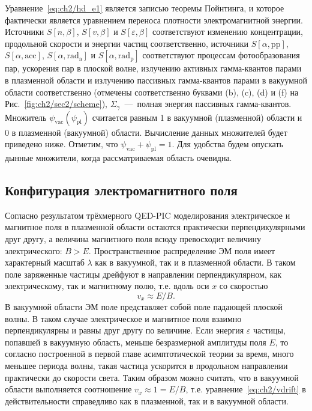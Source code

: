 Уравнение~\eqref{eq:ch2/hd_e1} является записью теоремы Пойнтинга, и которое фактически является уравнением переноса плотности электромагнитной энергии.
Источники $S[n,\beta]$, $S[v,\beta]$ и $S[\varepsilon,\beta]$ соответствуют изменению концентрации, продольной скорости и энергии частиц соответственно, источники $S[\alpha, \mathrm{pp}]$, $S[\alpha, \mathrm{acc}]$, $S[\alpha, \mathrm{rad_a}]$ и $S[\alpha, \mathrm{rad_p}]$ соответствуют процессам фотообразования пар, ускорения пар в плоской волне, излучению активных гамма-квантов парами в плазменной области и излучению пассивных гамма-квантов парами в вакуумной области соответственно (отмечены соответственно буквами (b), (c), (d) и (f) на Рис.~\ref{fig:ch2/sec2/scheme}), $\Sigma_\gamma$~---~полная энергия пассивных гамма-квантов.
Множитель $\psi_\mathrm{vac}(\psi_\mathrm{pl})$ считается равным 1 в вакуумной (плазменной) области и 0 в плазменной (вакуумной) области.
Вычисление данных множителей будет приведено ниже.
Отметим, что $\psi_\mathrm{vac}+\psi_\mathrm{pl}=1$.
Для удобства будем опускать дынные множители, когда рассматриваемая область очевидна.

\subsection{Конфигурация электромагнитного поля}
\label{sub:ch2/sec3/fields}

Согласно результатом трёхмерного QED-PIC моделирования электрическое и магнитное поля в плазменной области остаются практически перпендикулярными друг другу, а величина магнитного поля всюду превосходит величину электрического: $B > E$.
Пространственное распределение ЭМ поля имеет характерный масштаб $\lambda$ как в вакуумной, так и в плазменной области.
В таком поле заряженные частицы дрейфуют в направлении перпендикулярном, как электрическому, так и магнитному полю, т.е. вдоль оси $x$ со скоростью
\begin{equation}
    \label{eq:ch2/vdrift}
    v_x\approx E/B.
\end{equation}
В вакуумной области ЭМ поле представляет собой поле падающей плоской волны.
В таком случае электрическое и магнитное поля взаимно перпендикулярны и равны друг другу по величине.
Если энергия $\varepsilon$ частицы, попавшей в вакуумную область, меньше безразмерной амплитуды поля $E$, то согласно построенной в первой главе асимптотической теории за время, много меньшее периода волны, такая частица ускорится в продольном направлении практически до скорости света.
Таким образом можно считать, что в вакуумной области выполняется соотношение $v_x\approx 1=E/B$, т.е. уравнение~\eqref{eq:ch2/vdrift} в действительности справедливо как в плазменной, так и в вакуумной области.


